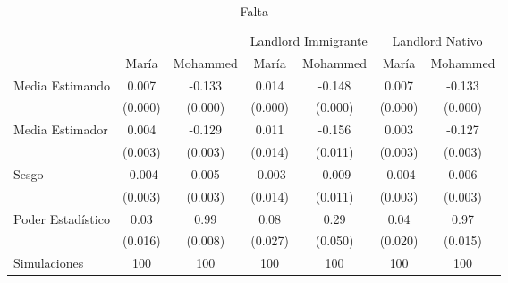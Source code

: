 \begin{table}[H]
\centering
\begin{tabular}{lcccccc}
\hline
 & & & \multicolumn{2}{c}{Landlord Immigrante} & \multicolumn{2}{c}{Landlord Nativo} \\
 & María & Mohammed & María & Mohammed & María & Mohammed \\
\hline
Media Estimando & 0.007 & -0.133 & 0.014 & -0.148 & 0.007 & -0.133 \\
 & (0.000) & (0.000) & (0.000) & (0.000) & (0.000) & (0.000) \\
Media Estimador & 0.004 & -0.129 & 0.011 & -0.156 & 0.003 & -0.127 \\
 & (0.003) & (0.003) & (0.014) & (0.011) & (0.003) & (0.003) \\
Sesgo & -0.004 & 0.005 & -0.003 & -0.009 & -0.004 & 0.006 \\
 & (0.003) & (0.003) & (0.014) & (0.011) & (0.003) & (0.003) \\
Poder Estadístico & 0.03 & 0.99 & 0.08 & 0.29 & 0.04 & 0.97 \\
 & (0.016) & (0.008) & (0.027) & (0.050) & (0.020) & (0.015) \\
Simulaciones & 100 & 100 & 100 & 100 & 100 & 100 \\
\hline
\end{tabular}
\caption{Falta}
\end{table}


